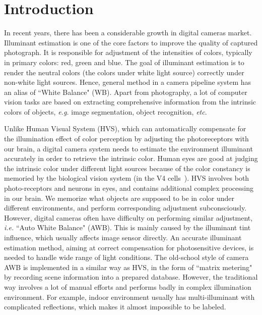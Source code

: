 \documentclass[10pt,twocolumn,letterpaper]{article}
\begin{document}
\section{Introduction}

In recent years, there has been a considerable growth in digital cameras market.
Illuminant estimation is one of the core factors to improve the quality of captured photograph.
It is responsible for adjustment of the intensities of colors,
typically in primary colors: red, green and blue.
The goal of illuminant estimation is to render the neutral colors (the colors under white light source) correctly under non-white light sources.
Hence, general method in a camera pipeline system has an alias of ``White Balance" (WB).
Apart from photography, a lot of computer vision tasks are based on extracting comprehensive information from
the intrinsic colors of objects, \textit{e.g.} image segmentation, object recognition, \textit{etc}.

Unlike Human Visual System (HVS), which can automatically compensate for the illumination effect
of color perception by adjusting the photoreceptors with our brain,
a digital camera system needs to estimate the environment illuminant
accurately in order to retrieve the intrinsic color.
Human eyes are good at judging the intrinsic color under different light sources
because of the color constancy is memoried by the biological vision system (in the V4 cells~\cite{khalil2015biologically}).
HVS involves both photo-receptors and neurons in eyes,
and contains additional complex processing in our brain.
We memorize what objects are supposed to be in color under different environments,
and perform corresponding adjustment subconsciously.
However, digital cameras often have difficulty on performing similar adjustment, \textit{i.e.} ``Auto White Balance" (AWB).
This is mainly caused by the illuminant tint influence, which usually affects image sensor directly.
An accurate illuminant estimation method, aiming at correct compensation for photosensitive devices, is needed to handle wide range of light conditions.
The old-school style of camera AWB is implemented in a similar way as HVS,
in the form of ``matrix metering" by recording scene information into a prepared database.
However, the traditional way involves a lot of manual efforts and performs badly in complex illumination environment.
For example, indoor environment usually has multi-illuminant with complicated reflections, which
makes it almost impossible to be labeled.
\end{document}
